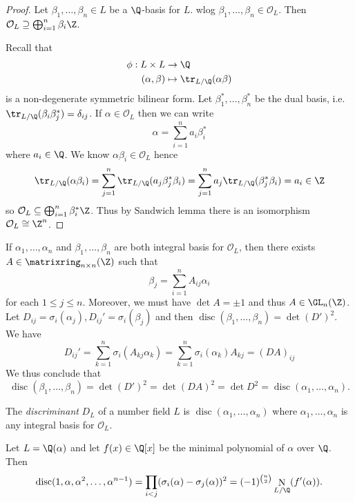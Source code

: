 \documentclass[a4paper]{article}
\renewcommand*{\O}{\mathcal{O}}
\DeclareMathOperator{\n}{N}
\DeclareMathOperator{\disc}{disc}
\begin{document}
\begin{proof}
  Let \(\beta_1, \dots, \beta_n \in L\) be a \(\Q\)-basis for \(L\). wlog \(\beta_1, \dots, \beta_n \in \O_L\). Then \(\O_L \supseteq \bigoplus_{i = 1}^n \beta_i\Z\).

  Recall that
  \begin{align*}
    \phi: L \times L &\to \Q \\
    (\alpha, \beta) &\mapsto \tr_{L/\Q}(\alpha\beta)
  \end{align*}
  is a non-degenerate symmetric bilinear form. Let \(\beta_1^*, \dots, \beta_n^*\) be the dual basis, i.e.\ \(\tr_{L/\Q}(\beta_i \beta_j^*) = \delta_{ij}\). If \(\alpha \in \O_L\) then we can write
  \[
    \alpha = \sum_{i = 1}^n a_i\beta_i^*
  \]
  where \(a_i \in \Q\). We know \(\alpha\beta_i \in \O_L\) hence
  \[
    \tr_{L/\Q}(\alpha\beta_i)
    = \sum_{j = 1}^n \tr_{L/\Q}(a_j\beta_j^*\beta_i)
    = \sum_{j = 1}^n a_j \tr_{L/\Q} (\beta_j^*\beta_i)
    = a_i
    \in \Z
  \]
  so \(\O_L \subseteq \bigoplus_{i = 1}^n \beta_i^*\Z\). Thus by Sandwich lemma there is an isomorphism \(\O_L \cong \Z^n\).
\end{proof}

If \(\alpha_1, \dots, \alpha_n\) and \(\beta_1, \dots, \beta_n\) are both integral basis for \(\O_L\), then there exists \(A \in \matrixring_{n \times n}(\Z)\) such that
\[
  \beta_j = \sum_{i = 1}^n A_{ij}\alpha_i
\]
for each \(1 \leq j \leq n\). Moreover, we must have \(\det A = \pm 1\) and thus \(A \in \GL_n(\Z)\). Let \(D_{ij} = \sigma_i(\alpha_j), D_{ij}' = \sigma_i(\beta_j)\) and then \(\disc(\beta_1, \dots, \beta_n) = \det (D')^2\). We have
\[
  D_{ij}'
  = \sum_{k = 1}^n \sigma_i(A_{kj}\alpha_k)
  = \sum_{k = 1}^n \sigma_i(\alpha_k) A_{kj}
  = (DA)_{ij}
\]
We thus conclude that
\[
  \disc(\beta_1, \dots, \beta_n)
  = \det (D')^2
  = \det (DA)^2
  = \det D^2
  = \disc(\alpha_1, \dots, \alpha_n).
\]

\begin{definition}[Discriminant]
  The \emph{discriminant} \(D_L\) of a number field \(L\) is \(\disc(\alpha_1, \dots, \alpha_n)\) where \(\alpha_1, \dots, \alpha_n\) is any integral basis for \(\O_L\).
\end{definition}

\begin{proposition}
  Let \(L = \Q(\alpha)\) and let \(f(x) \in \Q[x]\) be the minimal polynomial of \(\alpha\) over \(\Q\). Then
  \[
    \disc(1, \alpha, \alpha^2, \dots, \alpha^{n - 1})
    = \prod_{i < j} (\sigma_i(\alpha) - \sigma_j(\alpha))^2
    = (-1)^{\binom{n}{2}} \n_{L/\Q}(f'(\alpha)).
  \]
\end{proposition}
\end{document}
